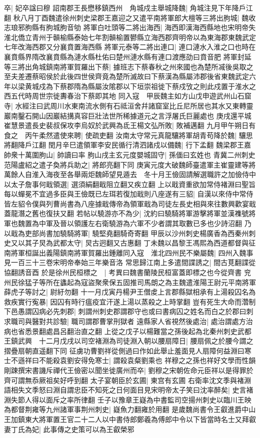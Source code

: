 卒|{
	妃卒諡曰穆}
詔南郡王長懋移鎮西州　角城戍主舉城降魏|{
	角城注見下年降戶江翻}
秋八月丁酉魏遣徐州刺史梁郡王嘉迎之又遣平南將軍郎大檀等三將出胊城|{
	魏收志琅邪朐縣有胊城胊音劬}
將軍白吐頭等二將出海西|{
	海西即漢海西縣地也宋明帝失淮北僑立青州于贑榆縣泰始七年割贑榆置鬰縣立海西郡齊明帝以為東海郡東魏武定七年改海西郡又分襄賁置海西縣}
將軍元泰等二將出連口|{
	連口漣水入淮之口也時在襄賁縣界隋改襄賁縣為漣水縣杜佑曰楚州漣水縣有連口渡應劭曰賁音肥}
將軍封延等三將出角城鎮南將軍賀羅出下蔡|{
	據班志下蔡春秋之州來國也為楚所㓕後吳取之至夫差遷蔡昭侯於此後四世侯齊竟為楚所滅故曰下蔡漢為縣屬沛郡後省東魏武定六年以梁黄城戍為下蔡郡隋為縣屬汝隂郡以下垣崇祖徙下蔡戍攷之則此戍置于淮水之西五代時周世宗徙夀春治下蔡即其地}
同入寇　甲辰魏主如方山戊申遊武州山石窟寺|{
	水經注曰武周川水東南流水側有石祗洹舍幷諸窟室比丘尼所居也其水又東轉靈巖南鑿石開山因巖結搆真容巨壯法世所稀據道元之言浮屠氏巨麗處也}
庚戌還平城　崔慧景遣長史裴叔保攻李烏奴於武興為氐王楊文弘所敗|{
	敗補邁翻}
九月甲午朔日有食之　丙午柔然遣使來聘|{
	使疏吏翻}
汝南太守常元真龍驤將軍胡青苟降於魏|{
	驤思將翻降戶江翻}
閏月辛巳遣領軍李安民循行清泗諸戍以備魏|{
	行下孟翻}
魏梁郡王嘉帥衆十萬圍朐山|{
	帥讀曰率}
胊山戌主玄元度嬰城固守|{
	孫偭曰玄姓也}
青冀二州刺史范陽盧紹之遣子奐將兵助之|{
	將郎亮翻下同}
庚寅元度大破魏師臺遣軍主崔靈建等將萬餘人自淮入海夜至各舉兩炬魏師望見遁去　冬十月王儉固請解選職許之加儉侍中以太子詹事何戢領選|{
	選須絹翻戢阻立翻又疾立翻}
上以戢資重欲加常侍褚淵曰聖旨每以蟬冕不宜過多臣與王儉既已左珥若復加戢則八座遂有三貂|{
	自漢以來侍中常侍皆左貂令僕與列曹尚書為八座據戢傳帝為領軍戢為司徒左長史相與來往數興歡宴戢蓋龍潛之舊也復扶又翻}
若帖以驍游亦不為少|{
	沈約曰驍騎將軍游擊將軍並漢襍號將軍也魏置為中軍及晉以領護左右衛驍游為六軍不少者謂其取數已多也少詩沼翻}
乃以戢為吏部尚書加驍騎將軍|{
	驍堅堯翻騎奇寄翻}
甲辰以沙州刺史楊廣香為西秦州刺史又以其子炅為武都太守|{
	炅古迥翻又古惠翻}
丁未魏以昌黎王馮熙為西道都督與征南將軍桓誕出義陽鎮南將軍賀羅出鍾離同入寇　淮北四州民不樂屬魏|{
	四州入魏事見一百三十三卷宋明帝奉始三年樂音洛}
常思歸江南上多遣間諜誘之|{
	間古莧翻諜從協翻誘音酉}
於是徐州民桓標之　|{
	考異曰魏書蘭陵民桓富蓋即標之也今從齊書}
兖州民徐猛子等所在蠭起為寇盜聚衆保五固推司馬朗之為主魏遣淮陽王尉元平南將軍薛虎子等討之|{
	尉紆勿翻}
十一月戊寅丹楊尹王僧䖍上言郡縣獄相承有上湯殺囚名為救疾實行寃暴|{
	因囚有時行瘟疫宜汗遂上湯以蒸殺之上時掌翻}
豈有死生大命而濳制下邑愚謂囚病必先刺郡|{
	刺謂州刺史郡謂郡守也或曰書病囚之姓名而白之於郡曰刺}
求職司與醫對共診驗|{
	職司謂郡曹掌刑獄者}
遠縣家人省視然後處治|{
	處治謂處方治病也省悉景翻處昌呂翻治直之翻}
上從之戊子以楊難當之孫後起為北秦州刺史武都王鎮武興　十二月戊戌以司空褚淵為司徒淵入朝以腰扇障日|{
	腰扇佩之於腰今謂之摺疊扇朝直遥翻下同}
征虜功曹劉祥從側過曰作如此舉止羞面見人扇障何益淵曰寒士不遜祥曰不能殺袁劉安得免寒士|{
	謂殺袁粲劉乘也}
祥穆之之孫也祥好文學而性韻剛踈撰宋書譏斥禪代王儉密以聞坐徙廣州而卒|{
	劉穆之宋朝佐命元臣祥以是得罪於齊可謂無忝厥祖矣好呼到翻}
太子宴朝臣於玄圃|{
	東宫有玄圃}
右衛率沈文季與褚淵語相失文季怒曰淵自謂忠臣不知死之日何面目見宋明帝太子笑曰沈率醉矣|{
	史言褚淵失節人得以面斥之率所律翻}
壬子以豫章王嶷為中書監司空揚州刺史以臨川王映為都督荆雍等九州諸軍事荆州刺史|{
	嶷魚力翻雍於用翻}
是歲魏尚書令王叡進爵中山王加鎮東大將軍置王官二十二人以中書侍郎鄭羲為傅郎中令以下皆當時名士又拜叡妻丁氏為妃|{
	此事傳之史策可以為王叡榮邪}


